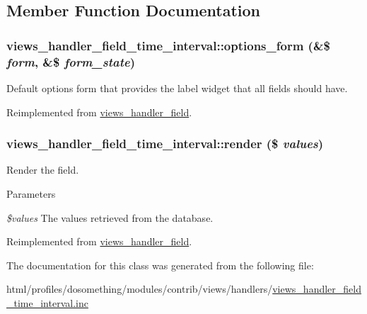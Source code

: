 \subsection{Member Function Documentation}
\hypertarget{classviews__handler__field__time__interval_a3ca80ab09f90fecda4883a588dfef30d}{
\subsubsection[{options\_\-form}]{\setlength{\rightskip}{0pt plus 5cm}views\_\-handler\_\-field\_\-time\_\-interval::options\_\-form (\&\$ {\em form}, \/  \&\$ {\em form\_\-state})}}
\label{classviews__handler__field__time__interval_a3ca80ab09f90fecda4883a588dfef30d}
Default options form that provides the label widget that all fields should have. 

Reimplemented from \hyperlink{classviews__handler__field_a0435d161922b7b4b84f02a2e79bb947a}{views\_\-handler\_\-field}.\hypertarget{classviews__handler__field__time__interval_aac98a5a54ec9f24cc730f114d2067524}{
\subsubsection[{render}]{\setlength{\rightskip}{0pt plus 5cm}views\_\-handler\_\-field\_\-time\_\-interval::render (\$ {\em values})}}
\label{classviews__handler__field__time__interval_aac98a5a54ec9f24cc730f114d2067524}
Render the field.


\begin{DoxyParams}{Parameters}
\item[{\em \$values}]The values retrieved from the database. \end{DoxyParams}


Reimplemented from \hyperlink{classviews__handler__field_a82ff951c5e9ceb97b2eab86f880cbc1e}{views\_\-handler\_\-field}.

The documentation for this class was generated from the following file:\begin{DoxyCompactItemize}
\item 
html/profiles/dosomething/modules/contrib/views/handlers/\hyperlink{views__handler__field__time__interval_8inc}{views\_\-handler\_\-field\_\-time\_\-interval.inc}\end{DoxyCompactItemize}
